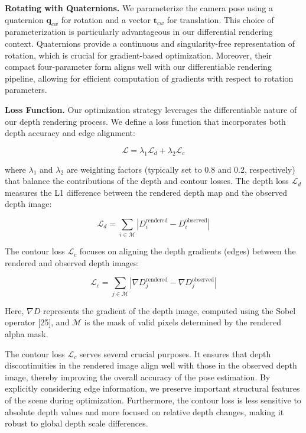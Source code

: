 \documentclass[twocolumn]{article} %
\begin{document}
\textbf{Rotating with Quaternions.} We parameterize the camera pose
using a quaternion \(\mathbf{q}_{cw}\) for rotation and a vector
\(\mathbf{t}_{cw}\) for translation. This choice of parameterization is
particularly advantageous in our differential rendering context.
Quaternions provide a continuous and singularity-free representation of
rotation, which is crucial for gradient-based optimization. Moreover,
their compact four-parameter form aligns well with our differentiable
rendering pipeline, allowing for efficient computation of gradients with
respect to rotation parameters.

\textbf{Loss Function.} Our optimization strategy leverages the
differentiable nature of our depth rendering process. We define a loss
function that incorporates both depth accuracy and edge alignment:

\[
\mathcal{L} = \lambda_1 \mathcal{L}_d + \lambda_2 \mathcal{L}_c
\]

where \(\lambda_1\) and \(\lambda_2\) are weighting factors (typically
set to 0.8 and 0.2, respectively) that balance the contributions of the
depth and contour losses. The depth loss \(\mathcal{L}_d\) measures the
L1 difference between the rendered depth map and the observed depth
image:

\[
\mathcal{L}_d = \sum_{i \in \mathcal{M}} \left| D_i^{\text{rendered}} - D_i^{\text{observed}} \right|
\]

The contour loss \(\mathcal{L}_c\) focuses on aligning the depth
gradients (edges) between the rendered and observed depth images:

\[
\mathcal{L}_c = \sum_{j \in \mathcal{M}} \left| \nabla D_j^{\text{rendered}} - \nabla D_j^{\text{observed}} \right|
\]

Here, \(\nabla D\) represents the gradient of the depth image, computed
using the Sobel operator {[}25{]}, and \(\mathcal{M}\) is the mask of
valid pixels determined by the rendered alpha mask.

The contour loss \(\mathcal{L}_{c}\) serves several crucial purposes. It
ensures that depth discontinuities in the rendered image align well with
those in the observed depth image, thereby improving the overall
accuracy of the pose estimation. By explicitly considering edge
information, we preserve important structural features of the scene
during optimization. Furthermore, the contour loss is less sensitive to
absolute depth values and more focused on relative depth changes, making
it robust to global depth scale differences.
\end{document}
